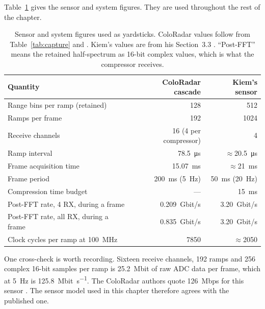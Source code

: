 \noindent
Table~\ref{tab:sensoryard} gives the sensor and system figures. They are used
throughout the rest of the chapter.

\begin{table}[htbp]
\centering
\caption[Sensor and system yardsticks]{Sensor and system figures used as
yardsticks. ColoRadar values follow from Table~\ref{tab:capture} and
\cite{kramer2022}. Kiem's values are from his Section~3.3 \cite{kiem2025}.
``Post-FFT'' means the retained half-spectrum as 16-bit complex values, which
is what the compressor receives.}
\label{tab:sensoryard}
\small
\begin{tabular}{@{}lrr@{}}
\toprule
Quantity & ColoRadar cascade & Kiem's sensor\\
\midrule
Range bins per ramp (retained)       & 128 & 512\\
Ramps per frame                      & 192 & 1024\\
Receive channels                     & 16 (4 per compressor) & 4\\
Ramp interval                        & \SI{78.5}{\micro\second} & $\approx$\SI{20.5}{\micro\second}\\
Frame acquisition time               & \SI{15.07}{\milli\second} & $\approx$\SI{21}{\milli\second}\\
Frame period                         & \SI{200}{\milli\second} (\SI{5}{\hertz}) & \SI{50}{\milli\second} (\SI{20}{\hertz})\\
Compression time budget              & --- & \SI{15}{\milli\second}\\
Post-FFT rate, 4 RX, during a frame  & \SI{0.209}{Gbit/s} & \SI{3.20}{Gbit/s}\\
Post-FFT rate, all RX, during a frame& \SI{0.835}{Gbit/s} & \SI{3.20}{Gbit/s}\\
Clock cycles per ramp at \SI{100}{\mega\hertz} & \num{7850} & $\approx$\num{2050}\\
\bottomrule
\end{tabular}
\end{table}

One cross-check is worth recording. Sixteen receive channels, 192 ramps and
256 complex 16-bit samples per ramp is \SI{25.2}{\mega bit} of raw ADC data per
frame, which at \SI{5}{\hertz} is \SI{125.8}{\mega bit\per\second}. The
ColoRadar authors quote \SI{126}{Mbps} for this sensor \cite{kramer2022}. The
sensor model used in this chapter therefore agrees with the published one.


